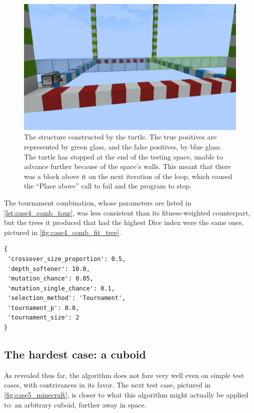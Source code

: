 \documentclass{report}
\newenvironment{code}{\captionsetup{type=listing}}{}
\begin{document}
\begin{figure}[H]
    \centering
    \includegraphics[scale=0.5]{case4_fit_minecraft}
    \caption{The structure constructed by the turtle. The true positives are represented by green glass, and the false positives, by blue glass. The turtle has stopped at the end of the testing space, unable to advance further because of the space's walls. This meant that there was a block above it on the next iteration of the loop, which caused the ``Place above'' call to fail and the program to stop.}
    \label{fig:case4_comb_fit_minecraft}
\end{figure}

The tournament combination, whose parameters are listed in \autoref{lst:case4_comb_tour}, was less consistent than its fitness-weighted counterpart, but the trees it produced that had the highest Dice index were the same ones, pictured in \autoref{fig:case4_comb_fit_tree}.

\begin{code}
    \begin{verbatim}
{
 'crossover_size_proportion': 0.5,
 'depth_softener': 10.0,
 'mutation_chance': 0.05,
 'mutation_single_chance': 0.1,
 'selection_method': 'Tournament',
 'tournament_p': 0.8,
 'tournament_size': 2
}
    \end{verbatim}
    \caption{A set of parameters that lead to an average index of $0.645$ and an average depth of $2.366$.}
    \label{lst:case4_comb_tour}
\end{code}

\subsection{The hardest case: a cuboid}

As revealed thus far, the algorithm does not fare very well even on simple test cases, with contrivances in its favor. The next test case, pictured in \autoref{fig:case5_minecraft}, is closer to what this algorithm might actually be applied to: an arbitrary cuboid, further away in space.
\end{document}
